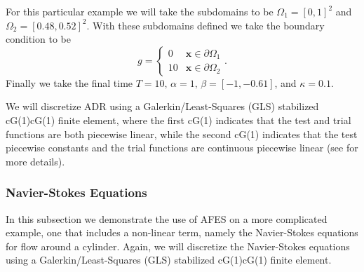     For this particular example we will take the subdomains to be $\Omega_1 =
    [0,1]^2$ and $\Omega_2 = [0.48,0.52]^2$. With these subdomains defined we
    take the boundary condition to be
    \begin{equation}
        g = \begin{cases}
            0   &\mathbf{x} \in \partial \Omega_1 \\
            10  &\mathbf{x} \in \partial \Omega_2
        \end{cases}.
        \label{eq:ADRBCs}
    \end{equation}
    Finally we take the final time $T=10,\, \alpha=1,\, \beta = \left[ -1,
    -0.61 \right]$, and $\kappa = 0.1$.

    We will discretize ADR using a Galerkin\slash Least-Squares (GLS) stabilized
    cG(1)cG(1) finite element, where the first cG(1) indicates that the test and
    trial functions are both piecewise linear, while the second cG(1) indicates
    that the test piecewise constants and the trial functions are continuous
    piecewise linear (see \cite{Hoffman2006a} for more details).

\subsubsection{Navier-Stokes Equations} \label{sss:NSE}

    In this subsection we demonstrate the use of AFES on a more complicated
    example, one that includes a non-linear term, namely the Navier-Stokes
    equations for flow around a cylinder.  Again, we will discretize the
    Navier-Stokes equations using a Galerkin\slash Least-Squares (GLS)
    stabilized cG(1)cG(1) finite element.

